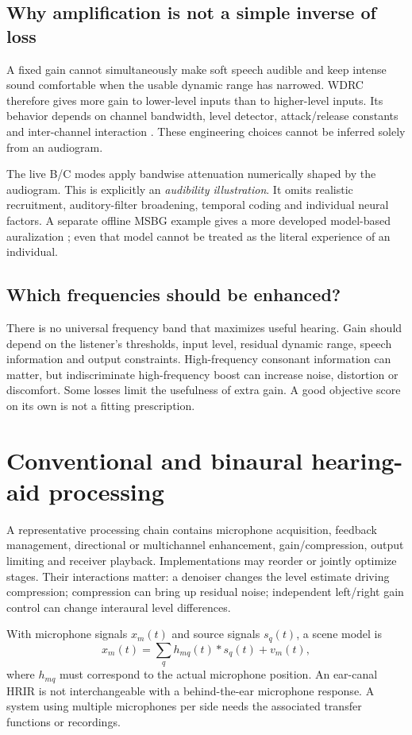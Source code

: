 \documentclass[11pt,a4paper]{article}
\begin{document}
\subsection{Why amplification is not a simple inverse of loss}
A fixed gain cannot simultaneously make soft speech audible and keep intense sound comfortable when the usable dynamic range has narrowed. WDRC therefore gives more gain to lower-level inputs than to higher-level inputs. Its behavior depends on channel bandwidth, level detector, attack/release constants and inter-channel interaction \cite{kates2005}. These engineering choices cannot be inferred solely from an audiogram.

The live B/C modes apply bandwise attenuation numerically shaped by the audiogram. This is explicitly an \emph{audibility illustration}. It omits realistic recruitment, auditory-filter broadening, temporal coding and individual neural factors. A separate offline MSBG example gives a more developed model-based auralization \cite{clarity,moore1997}; even that model cannot be treated as the literal experience of an individual.

\subsection{Which frequencies should be enhanced?}
There is no universal frequency band that maximizes useful hearing. Gain should depend on the listener's thresholds, input level, residual dynamic range, speech information and output constraints. High-frequency consonant information can matter, but indiscriminate high-frequency boost can increase noise, distortion or discomfort. Some losses limit the usefulness of extra gain. A good objective score on its own is not a fitting prescription.
\newpage
\section{Conventional and binaural hearing-aid processing}
A representative processing chain contains microphone acquisition, feedback management, directional or multichannel enhancement, gain/compression, output limiting and receiver playback. Implementations may reorder or jointly optimize stages. Their interactions matter: a denoiser changes the level estimate driving compression; compression can bring up residual noise; independent left/right gain control can change interaural level differences.

With microphone signals $x_m(t)$ and source signals $s_q(t)$, a scene model is
\begin{equation}
 x_m(t)=\sum_q h_{mq}(t)*s_q(t)+v_m(t),
\end{equation}
where $h_{mq}$ must correspond to the actual microphone position. An ear-canal HRIR is not interchangeable with a behind-the-ear microphone response. A system using multiple microphones per side needs the associated transfer functions or recordings.
\end{document}
